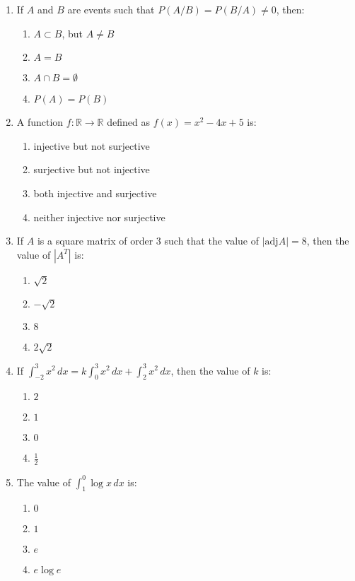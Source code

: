 \documentclass{article}
\begin{document}
\begin{enumerate}
    \item If $A$ and $B$ are events such that $P(A/B) = P(B/A) \neq 0$, then:
    \begin{enumerate}[label=(\alph*)]
        \item $A \subset B$, but $A \neq B$
        \item $A = B$
        \item $A \cap B = \emptyset$
        \item $P(A) = P(B)$
    \end{enumerate}

    \item A function $f: \mathbb{R} \to \mathbb{R}$ defined as $f(x) = x^2-4x+5$ is:
    \begin{enumerate}[label=(\alph*)]
        \item injective but not surjective
        \item surjective but not injective
        \item both injective and surjective
        \item neither injective nor surjective
    \end{enumerate}

    \item If $A$ is a square matrix of order 3 such that the value of $|\text{adj} A| = 8$, then the value of $|A^T|$ is:
    \begin{enumerate}[label=(\alph*)]
        \item $\sqrt{2}$
        \item $-\sqrt{2}$
        \item ${8}$
        \item $2 \sqrt{2}$
    \end{enumerate}

    \item If $\int_{-2}^{3} x^2 \, dx = k \int_0^3 x^2 \, dx + \int_2^3 x^2 \, dx$, then the value of $k$ is:
    \begin{enumerate}[label=(\alph*)]
        \item $2$
        \item $1$
        \item $0$
        \item $\frac{1}{2}$
    \end{enumerate}

    \item The value of $\int_{1}^{0} \log x \, dx$ is:
    \begin{enumerate}[label=(\alph*)]
        \item $0$
        \item $1$
        \item $e$
        \item $e \log e$
    \end{enumerate}


\end{enumerate}
\end{document}
